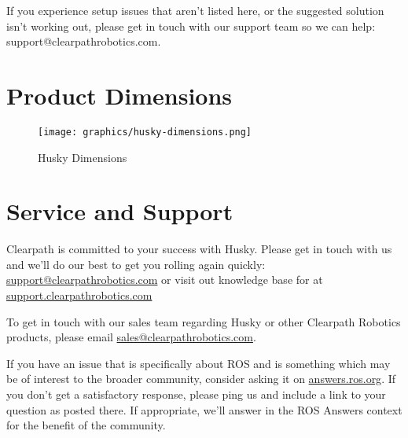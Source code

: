 \documentclass[]{clearpath-latex/clearpath-manual}
\begin{document}
If you experience setup issues that aren’t listed here, or the suggested solution isn’t working out, please get in touch with our support team so we can help: support@clearpathrobotics.com.

\newpage
\section{Product Dimensions}

\begin{figure}[h]
	\centering
	\texttt{[image: graphics/husky-dimensions.png]}
	\caption{Husky Dimensions}
\end{figure}
\newpage
\section{Service and Support}
Clearpath is committed to your success with Husky. Please get in touch with us and we'll
do our best to get you rolling again quickly: \href{mailto:support@clearpathrobotics.com}{support@clearpathrobotics.com}
or visit out knowledge base for at \href{http://support.clearpathrobotics.com}{support.clearpathrobotics.com}

To get in touch with our sales team regarding Husky or other Clearpath Robotics products, please
email \href{mailto:sales@clearpathrobotics.com}{sales@clearpathrobotics.com}.

If you have an issue that is specifically about ROS and is something which may be of interest
to the broader community, consider asking it on \href{http://answers.ros.org}{answers.ros.org}.
If you don't get a satisfactory response, please ping us and include a link to your question
as posted there. If appropriate, we'll answer in the ROS Answers context for the benefit of the
community.
\end{document}
